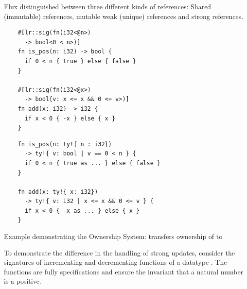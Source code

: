 Flux distinguished between three different kinds of references: 
Shared (immutable) references, mutable weak (unique) references and strong references.

\begin{listing}[h]
  \begin{minipage}[t]{0.48\linewidth}
    
    \begin{verbatim}
    #[lr::sig(fn(i32<@n>) 
      -> bool<0 < n>)]
    fn is_pos(n: i32) -> bool {
      if 0 < n { true } else { false }
    }

    #[lr::sig(fn(i32<@x>) 
      -> bool{v: x <= x && 0 <= v>)]
    fn add(x: i32) -> i32 {
      if x < 0 { -x } else { x }
    }
    \end{verbatim}
  \end{minipage}
  \begin{minipage}[t]{0.48\linewidth}
    \begin{verbatim}
    fn is_pos(n: ty!{ n : i32}) 
      -> ty!{ v: bool | v == 0 < n } {
      if 0 < n { true as ... } else { false }
    }

    fn add(x: ty!{ x: i32}) 
      -> ty!{ v: i32 | x <= x && 0 <= v } {
      if x < 0 { -x as ... } else { x }
    }
    \end{verbatim}
  \end{minipage}
  
  \caption{Example demonstrating the Ownership System:  transfers ownership of  to }
  \label{lst:compare-flux-fundamentals}
\end{listing}



To demonstrate the difference in the handling of strong updates, consider the signatures of incrementing and decrementing functions of a datatype . The functions are fully specifications and ensure the invariant that a natural number is a positive.

